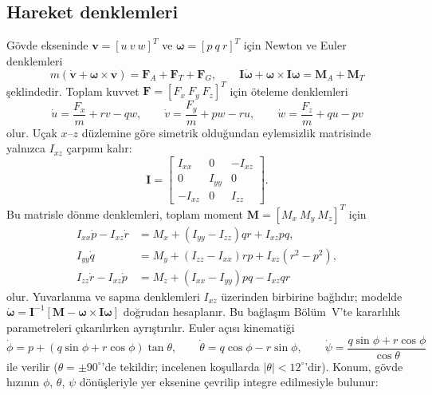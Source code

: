 \documentclass[conf]{new-aiaa}
\begin{document}
\subsection{Hareket denklemleri}
Gövde ekseninde $\mathbf v=[u\ v\ w]^T$ ve $\boldsymbol\omega=[p\ q\ r]^T$ için Newton ve Euler denklemleri~\cite{slj}
\begin{equation}
m(\dot{\mathbf v}+\boldsymbol\omega\times\mathbf v)=\mathbf F_A+\mathbf F_T+\mathbf F_G, \qquad
\mathbf I\dot{\boldsymbol\omega}+\boldsymbol\omega\times\mathbf I\boldsymbol\omega=\mathbf M_A+\mathbf M_T
\label{eq:eom}
\end{equation}
şeklindedir. Toplam kuvvet $\mathbf F=[F_x\ F_y\ F_z]^T$ için öteleme denklemleri
\begin{equation}
\dot u=\frac{F_x}{m}+rv-qw,\qquad
\dot v=\frac{F_y}{m}+pw-ru,\qquad
\dot w=\frac{F_z}{m}+qu-pv
\end{equation}
olur. Uçak $x$--$z$ düzlemine göre simetrik olduğundan eylemsizlik matrisinde yalnızca $I_{xz}$ çarpımı kalır:
\begin{equation}
\mathbf I=\begin{bmatrix} I_{xx} & 0 & -I_{xz}\\ 0 & I_{yy} & 0\\ -I_{xz} & 0 & I_{zz}\end{bmatrix}.
\end{equation}
Bu matrisle dönme denklemleri, toplam moment $\mathbf M=[M_x\ M_y\ M_z]^T$ için
\begin{equation}
\begin{aligned}
I_{xx}\dot p-I_{xz}\dot r&=M_x+(I_{yy}-I_{zz})qr+I_{xz}pq,\\
I_{yy}\dot q&=M_y+(I_{zz}-I_{xx})rp+I_{xz}(r^2-p^2),\\
I_{zz}\dot r-I_{xz}\dot p&=M_z+(I_{xx}-I_{yy})pq-I_{xz}qr
\end{aligned}
\label{eq:rot}
\end{equation}
olur. Yuvarlanma ve sapma denklemleri $I_{xz}$ üzerinden birbirine bağlıdır; modelde $\dot{\boldsymbol\omega}=\mathbf I^{-1}[\mathbf M-\boldsymbol\omega\times\mathbf I\boldsymbol\omega]$ doğrudan hesaplanır. Bu bağlaşım Bölüm~V'te kararlılık parametreleri çıkarılırken ayrıştırılır. Euler açısı kinematiği
\begin{equation}
\dot\phi=p+(q\sin\phi+r\cos\phi)\tan\theta,\qquad
\dot\theta=q\cos\phi-r\sin\phi,\qquad
\dot\psi=\frac{q\sin\phi+r\cos\phi}{\cos\theta}
\label{eq:kin}
\end{equation}
ile verilir ($\theta=\pm90^\circ$'de tekildir; incelenen koşullarda $|\theta|<12^\circ$'dir). Konum, gövde hızının $\phi$, $\theta$, $\psi$ dönüşleriyle yer eksenine çevrilip integre edilmesiyle bulunur:
\end{document}
